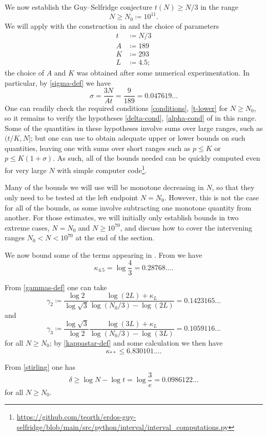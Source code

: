 \documentclass[10pt,a4paper,reqno]{amsart}
\numberwithin{equation}{section}
\theoremstyle{plain}
\theoremstyle{definition}
\begin{document}
We now establish the Guy--Selfridge conjecture $t(N) \geq N/3$ in the range
$$ N \geq N_0 \coloneqq 10^{11}.$$
We will apply  with the construction in  and the choice of parameters
\begin{align*}
  t &\coloneqq N/3\\
  A &\coloneqq 189\\
  K &\coloneqq 293 \\
  L &\coloneqq 4.5;
\end{align*}
the choice of $A$ and $K$ was obtained after some numerical experimentation.  In particular, by \eqref{sigma-def} we have
$$ \sigma = \frac{3N}{At}=\frac{9}{189} =0.047619\dots$$
One can readily check the required conditions \eqref{conditions}, \eqref{t-lower} for $N \geq N_0$, so it remains to verify the hypotheses \eqref{delta-cond}, \eqref{alpha-cond} of  in this range.  Some of the quantities in these hypotheses involve sums over large ranges, such as $(t/K,N]$; but one can use  to obtain adequate upper or lower bounds on such quantities, leaving one with sums over short ranges such as $p \leq K$ or $p \leq K(1+\sigma)$.  As such, all of the bounds needed can be quickly computed even for very large $N$ with simple computer code\footnote{\url{https://github.com/teorth/erdos-guy-selfridge/blob/main/src/python/interval/interval_computations.py}}.

Many of the bounds we will use will be monotone decreasing in $N$, so that they only need to be tested at the left endpoint $N=N_0$.  However, this is not the case for all of the bounds, as some involve subtracting one monotone quantity from another.  For those estimates, we will initially only establish bounds in two extreme cases, $N=N_0$ and $N \geq 10^{70}$, and discuss how to cover the intervening ranges $N_0 < N < 10^{70}$ at the end of the section.
  
We now bound some of the terms appearing in . From  we have
$$ \kappa_{4.5} = \log \frac{4}{3} =0.28768\dots.$$

From \eqref{gammas-def} one can take
$$ \gamma_2 \coloneqq \frac{\log 2}{\log \sqrt{3}} \frac{\log(2L) + \kappa_L}{\log(N_0/3) - \log(2L)} = 0.1423165\dots$$
and
$$\gamma_3 \coloneqq \frac{\log \sqrt{3}}{\log 2} \frac{\log(3L) + \kappa_L}{\log(N_0/3) - \log(3L)} =  0.1059116 \dots$$
for all $N \geq N_0$; by \eqref{kappastar-def} and some calculation we then have
$$ \kappa_{**} \leq 6.830101\dots.$$

From \eqref{stirling} one has
$$ \delta \geq \log N - \log t = \log \frac{3}{e} = 0.0986122\dots$$
for all $N \geq N_0$.  
\end{document}
